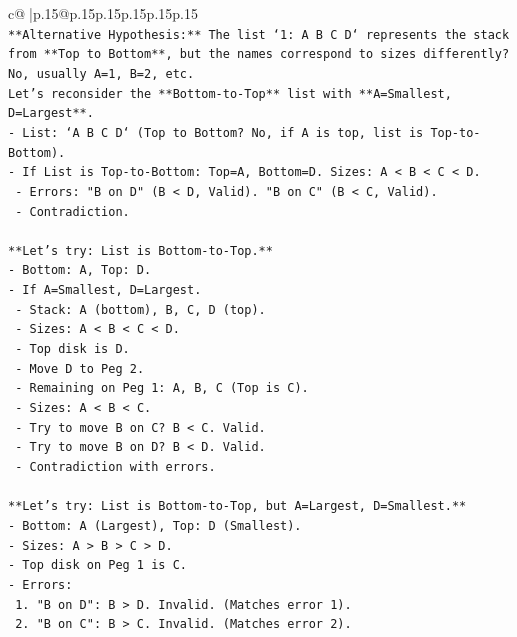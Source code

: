 \documentclass{article}
\begin{document}
{\begin{supertabular}{c@{$\;$}|p{.15\linewidth}@{}p{.15\linewidth}p{.15\linewidth}p{.15\linewidth}p{.15\linewidth}p{.15\linewidth}}
{{{\\ 
\texttt{**Alternative Hypothesis:** The list `1: A B C D` represents the stack from **Top to Bottom**, but the names correspond to sizes differently?} \\
\texttt{No, usually A=1, B=2, etc.} \\
\texttt{Let's reconsider the **Bottom{-}to{-}Top** list with **A=Smallest, D=Largest**.} \\
\texttt{{-} List: `A B C D` (Top to Bottom? No, if A is top, list is Top{-}to{-}Bottom).} \\
\texttt{{-} If List is Top{-}to{-}Bottom: Top=A, Bottom=D. Sizes: A < B < C < D.} \\
\texttt{  {-} Errors: "B on D" (B < D, Valid). "B on C" (B < C, Valid).} \\
\texttt{  {-} Contradiction.} \\
\\ 
\texttt{**Let's try: List is Bottom{-}to{-}Top.**} \\
\texttt{{-} Bottom: A, Top: D.} \\
\texttt{{-} If A=Smallest, D=Largest.} \\
\texttt{  {-} Stack: A (bottom), B, C, D (top).} \\
\texttt{  {-} Sizes: A < B < C < D.} \\
\texttt{  {-} Top disk is D.} \\
\texttt{  {-} Move D to Peg 2.} \\
\texttt{  {-} Remaining on Peg 1: A, B, C (Top is C).} \\
\texttt{  {-} Sizes: A < B < C.} \\
\texttt{  {-} Try to move B on C? B < C. Valid.} \\
\texttt{  {-} Try to move B on D? B < D. Valid.} \\
\texttt{  {-} Contradiction with errors.} \\
\\ 
\texttt{**Let's try: List is Bottom{-}to{-}Top, but A=Largest, D=Smallest.**} \\
\texttt{{-} Bottom: A (Largest), Top: D (Smallest).} \\
\texttt{{-} Sizes: A > B > C > D.} \\
\texttt{{-} Top disk on Peg 1 is C.} \\
\texttt{{-} Errors:} \\
\texttt{  1. "B on D": B > D. Invalid. (Matches error 1).} \\
\texttt{  2. "B on C": B > C. Invalid. (Matches error 2).} \\
}}}
\end{supertabular}}
\end{document}

